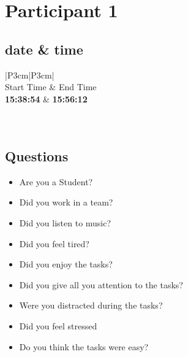 \section{Participant 1}

\subsection{date \& time}
\begin{table}[ht]
  \begin{tabular}{|P{3cm}|P{3cm}|}
	    	\\ \hline
    Start Time      			& End Time   					\\ \hline
   \textbf{15:38:54} 	& \textbf{15:56:12}    	\\ \hline
       						\\ \hline
    			\\ \hline
  \end{tabular}
  \newline\newline
  \caption{date and time}\label{dandt1}
\end{table}

\subsection{Questions}
\begin{itemize}
  \item[\Checkmark] Are you a Student?
  \item[\XSolidBrush] Did you work in a team?
  \item[\XSolidBrush] Did you listen to music?
  \item[\Checkmark] Did you feel tired?
  \item[\XSolidBrush] Did you enjoy the tasks?
  \item[\XSolidBrush] Did you give all you attention to the tasks?
  \item[\XSolidBrush] Were you distracted during the tasks?
  \item[\Checkmark] Did you feel stressed
  \item[\XSolidBrush] Do you think the tasks were easy?  
\end{itemize}

\newpage


